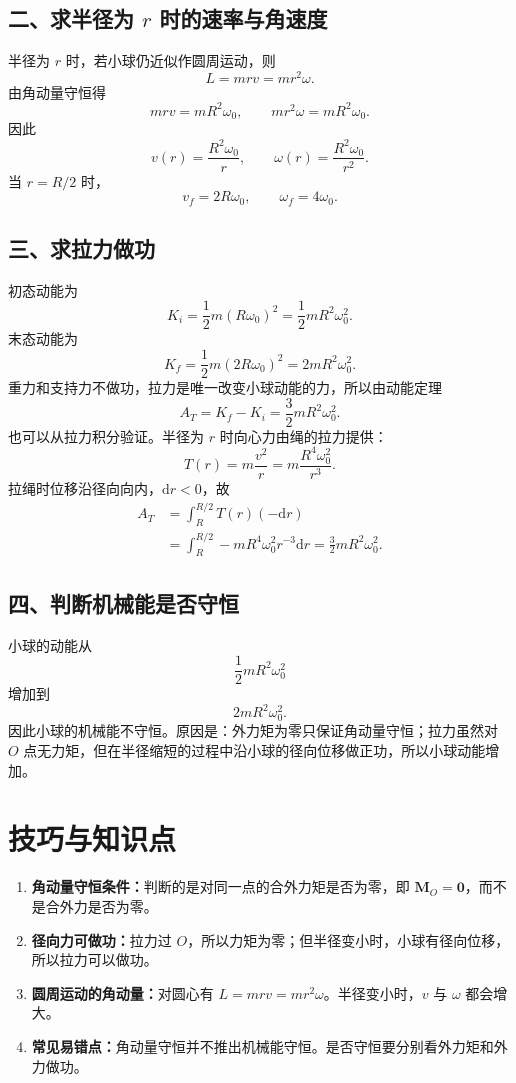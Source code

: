 \documentclass[11pt,a4paper]{ctexart}
\newcommand{\dd}{\mathrm{d}}
\begin{document}
\subsection*{二、求半径为 $r$ 时的速率与角速度}

半径为 $r$ 时，若小球仍近似作圆周运动，则
\[
  L=mrv=m r^2\omega .
\]
由角动量守恒得
\[
  mrv=mR^2\omega_0,
  \qquad
  mr^2\omega=mR^2\omega_0.
\]
因此
\[
  \boxed{v(r)=\frac{R^2\omega_0}{r}},
  \qquad
  \boxed{\omega(r)=\frac{R^2\omega_0}{r^2}}.
\]
当 $r=R/2$ 时，
\[
  \boxed{v_f=2R\omega_0},
  \qquad
  \boxed{\omega_f=4\omega_0}.
\]

\subsection*{三、求拉力做功}

初态动能为
\[
  K_i=\frac12 m(R\omega_0)^2
      =\frac12 mR^2\omega_0^2 .
\]
末态动能为
\[
  K_f=\frac12 m(2R\omega_0)^2
      =2mR^2\omega_0^2 .
\]
重力和支持力不做功，拉力是唯一改变小球动能的力，所以由动能定理
\[
  A_T=K_f-K_i
      =\boxed{\frac32 mR^2\omega_0^2}.
\]
也可以从拉力积分验证。半径为 $r$ 时向心力由绳的拉力提供：
\[
  T(r)=m\frac{v^2}{r}
      =m\frac{R^4\omega_0^2}{r^3}.
\]
拉绳时位移沿径向向内，$\dd r<0$，故
\[
\begin{aligned}
  A_T
  &=\int_R^{R/2}T(r)(-\dd r)  \\
  &=\int_R^{R/2}-mR^4\omega_0^2r^{-3}\dd r
   =\frac32 mR^2\omega_0^2 .
\end{aligned}
\]

\subsection*{四、判断机械能是否守恒}

小球的动能从
\[
  \frac12 mR^2\omega_0^2
\]
增加到
\[
  2mR^2\omega_0^2 .
\]
因此小球的机械能不守恒。原因是：外力矩为零只保证角动量守恒；拉力虽然对 $O$ 点无力矩，但在半径缩短的过程中沿小球的径向位移做正功，所以小球动能增加。

\section*{技巧与知识点}

\begin{tipBox}
\begin{enumerate}
  \item \textbf{角动量守恒条件：}判断的是对同一点的合外力矩是否为零，即 $\bm M_O=\bm 0$，而不是合外力是否为零。
  \item \textbf{径向力可做功：}拉力过 $O$，所以力矩为零；但半径变小时，小球有径向位移，所以拉力可以做功。
  \item \textbf{圆周运动的角动量：}对圆心有 $L=mrv=mr^2\omega$。半径变小时，$v$ 与 $\omega$ 都会增大。
  \item \textbf{常见易错点：}角动量守恒并不推出机械能守恒。是否守恒要分别看外力矩和外力做功。
\end{enumerate}
\end{tipBox}
\end{document}
